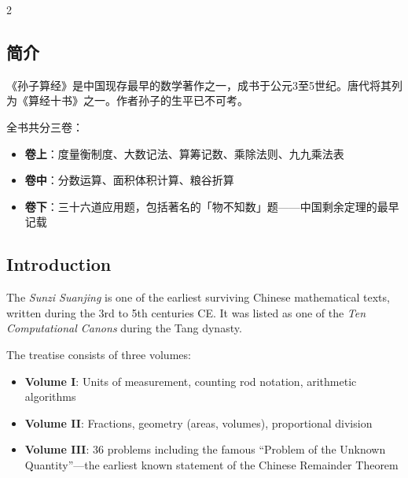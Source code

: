 \documentclass[11pt,a4paper]{article}
\begin{document}
\tableofcontents
\newpage

\begin{paracol}{2}

\begin{classicalbox}
\section*{简介}

《孙子算经》是中国现存最早的数学著作之一，成书于公元3至5世纪。唐代将其列为《算经十书》之一。作者孙子的生平已不可考。

全书共分三卷：
\begin{itemize}[leftmargin=1.5em,topsep=2pt,itemsep=1pt]
  \item \textbf{卷上}：度量衡制度、大数记法、算筹记数、乘除法则、九九乘法表
  \item \textbf{卷中}：分数运算、面积体积计算、粮谷折算
  \item \textbf{卷下}：三十六道应用题，包括著名的「物不知数」题——中国剩余定理的最早记载
\end{itemize}
\end{classicalbox}

\switchcolumn

\begin{modernbox}
\section*{Introduction}

The \textit{Sunzi Suanjing} is one of the earliest surviving Chinese mathematical texts, written during the 3rd to 5th centuries CE. It was listed as one of the \textit{Ten Computational Canons} during the Tang dynasty.

The treatise consists of three volumes:
\begin{itemize}[leftmargin=1.5em,topsep=2pt,itemsep=1pt]
  \item \textbf{Volume I}: Units of measurement, counting rod notation, arithmetic algorithms
  \item \textbf{Volume II}: Fractions, geometry (areas, volumes), proportional division
  \item \textbf{Volume III}: 36 problems including the famous ``Problem of the Unknown Quantity''—the earliest known statement of the Chinese Remainder Theorem
\end{itemize}
\end{modernbox}

\end{paracol}
\end{document}

